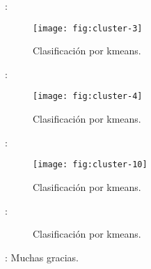 \begin{frame}{\secname : \subsecname}
  \begin{figure}
    \centering
    \texttt{[image: fig:cluster-3]}
    \caption{Clasificación por kmeans.}
    \label{}
  \end{figure}
\end{frame}

\begin{frame}{\secname : \subsecname}
  \begin{figure}
    \centering
    \texttt{[image: fig:cluster-4]}
    \caption{Clasificación por kmeans.}
    \label{}
  \end{figure}
\end{frame}

\begin{frame}{\secname : \subsecname}
  \begin{figure}
    \centering
    \texttt{[image: fig:cluster-10]}
    \caption{Clasificación por kmeans.}
    \label{}
  \end{figure}
\end{frame}

\begin{frame}{\secname : \subsecname}
  \begin{figure}
    \centering
    \hspace{1cm}
    \caption{Clasificación por kmeans.}
    \label{}
  \end{figure}
\end{frame}




\begin{frame}{\secname : \subsecname}
Muchas gracias.
\end{frame}
